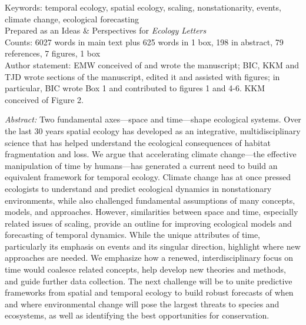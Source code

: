 \documentclass[11pt,a4paper,oneside]{article}
\begin{document}
\noindent Keywords: temporal ecology, spatial ecology, scaling, nonstationarity, events, climate change, ecological forecasting\\

\noindent Prepared as an Ideas \& Perspectives for \emph{Ecology Letters}\\

\noindent Counts: 6027 words in main text plus 625 words in 1 box, 198 in abstract, 79 references, 7 figures, 1 box \\ %

\noindent Author statement: EMW conceived of and wrote the manuscript; BIC, KKM and TJD wrote sections of the manuscript, edited it and assisted with figures; in particular, BIC wrote Box 1 and contributed to figures 1 and 4-6. KKM conceived of Figure 2.


\newpage
\noindent \emph{Abstract:} Two fundamental axes---space and time---shape ecological systems. Over the last 30 years spatial ecology has developed as an integrative, multidisciplinary science that has helped understand the ecological consequences of habitat fragmentation and loss. We argue that accelerating climate change---the effective manipulation of time by humans---has generated a current need to build an equivalent framework for temporal ecology. Climate change has at once pressed ecologists to understand and predict ecological dynamics in nonstationary environments, while also challenged fundamental assumptions of many concepts, models, and approaches. However, similarities between space and time, especially related issues of scaling, provide an outline for improving ecological models and forecasting of temporal dynamics. While the unique attributes of time, particularly its emphasis on events and its singular direction, highlight where new approaches are needed. We emphasize how a renewed, interdisciplinary focus on time would coalesce related concepts, help develop new theories and methods, and guide further data collection. The next challenge will be to unite predictive frameworks from spatial and temporal ecology to build robust forecasts of when and where environmental change will pose the largest threats to species and ecosystems, as well as identifying the best opportunities for conservation. 
\end{document}
